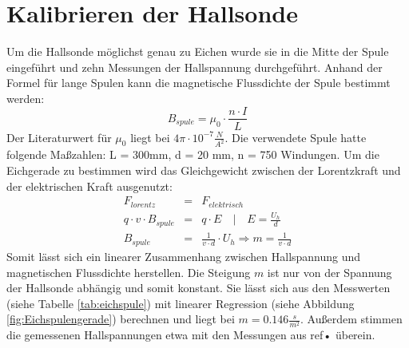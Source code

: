 \section{Kalibrieren der Hallsonde}
\label{KalibrierungHallsonde}
Um die Hallsonde möglichst genau zu Eichen wurde sie in die Mitte der Spule eingeführt und zehn Messungen der Hallspannung durchgeführt. Anhand der Formel für lange Spulen kann die magnetische Flussdichte der Spule bestimmt werden:
\begin{equation*}
B_{spule} = \mu_0 \cdot \frac{n \cdot I}{L}
\end{equation*}
Der Literaturwert für $\mu_0$ liegt bei $4\pi \cdot 10^{-7} \frac{N}{A^2}$.
\newline
Die verwendete Spule hatte folgende Maßzahlen: L = 300mm, d = 20 mm, n = 750 Windungen.
\newline
Um die Eichgerade zu bestimmen wird das Gleichgewicht zwischen der Lorentzkraft und der elektrischen Kraft ausgenutzt:
\begin{eqnarray*}
F_{lorentz} &=& F_{elektrisch} \\
q \cdot v \cdot B_{spule} &=& q \cdot E \quad | \quad E = \frac{U_h}{d}\\
B_{spule} &=&\frac{1}{v \cdot d} \cdot U_h \Rightarrow m = \frac{1}{v \cdot d}
\end{eqnarray*}
Somit lässt sich ein linearer Zusammenhang zwischen Hallspannung und magnetischen Flussdichte herstellen. Die Steigung $m$ ist nur von der Spannung der Hallsonde abhängig und somit konstant. 
\newline
Sie lässt sich aus den Messwerten (siehe Tabelle \ref{tab:eichspule}) mit linearer Regression (siehe Abbildung \ref{fig:Eichspulengerade}) berechnen und liegt bei $m = 0.146 \frac{s}{m^2}$. Außerdem stimmen die gemessenen Hallspannungen etwa mit den Messungen aus ref{•} überein.

